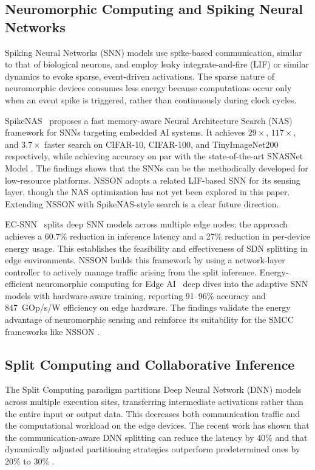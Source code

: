 \documentclass[journal]{IEEEtran}
\begin{document}
\subsection{Neuromorphic Computing and Spiking Neural Networks}

Spiking Neural Networks (SNN) models use spike-based communication, similar to that of biological neurons, and employ leaky integrate-and-fire (LIF) or similar dynamics to evoke sparse, event-driven activations. The sparse nature of neuromorphic devices consumes less energy because computations occur only when an event spike is triggered, rather than continuously during clock cycles.

SpikeNAS~\cite{putra2025spikenas} proposes a fast memory-aware Neural Architecture Search (NAS) framework for SNNs targeting embedded AI systems. It achieves $29\times$, $117\times$,
and $3.7\times$ faster search on CIFAR-10, CIFAR-100, and TinyImageNet200
respectively, while achieving accuracy on par with the state-of-the-art SNASNet Model \cite{kim2022neural}. The findings shows that the SNNs can be the methodically developed for low-resource platforms. NSSON adopts a related LIF-based SNN for its sensing layer, though the NAS optimization has not yet been explored in this paper. Extending NSSON with SpikeNAS-style search is a clear future direction. %

EC-SNN~\cite{di2024ec} splits deep SNN models across multiple edge nodes; the approach achieves a 60.7\% reduction in inference latency and a 27\% reduction in per-device energy usage. This establishes the feasibility and effectiveness of SDN splitting in edge environments. NSSON builds this framework by using a network-layer controller to actively manage traffic arising from the split inference.
Energy-efficient neuromorphic computing for Edge AI~\cite{ferdowsi2025distributed} deep dives into the adaptive SNN models with hardware-aware training, reporting 91--96\% accuracy and 847~GOp/s/W efficiency on edge hardware. The findings validate the energy advantage of neuromorphic sensing and reinforce its suitability for the SMCC frameworks like NSSON \cite{ferdowsi2025distributed,goltz2021fast}.

\subsection{Split Computing and Collaborative Inference}
The Split Computing paradigm partitions Deep Neural Network (DNN) models across multiple execution sites, transferring intermediate activations rather than the entire input or output data. This decreases both communication traffic and the computational workload on the edge devices. The recent work has shown that the communication-aware DNN splitting can reduce the latency by 40\% and that dynamically adjusted partitioning strategies outperform predetermined ones by 20\% to 30\% \cite{teerapittayanon2017distributed,chang2021survey,10534618,karjee2022split,wang2024end}.
\end{document}
